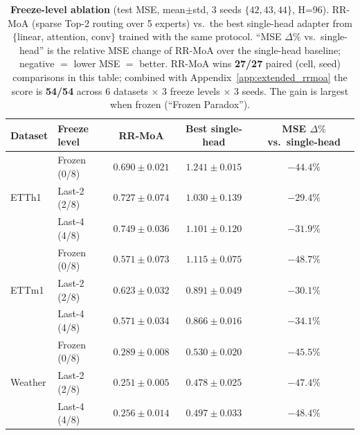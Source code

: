 \documentclass{article}
\begin{document}
\begin{table}[!htbp]
\centering
\caption{\textbf{Freeze-level ablation} (test MSE, mean$\pm$std, 3 seeds $\{42,43,44\}$, H=96). RR-MoA (sparse Top-2 routing over 5 experts) vs.\ the best single-head adapter from $\{$linear, attention, conv$\}$ trained with the same protocol. ``MSE $\Delta\%$ vs.\ single-head'' is the relative MSE change of RR-MoA over the single-head baseline; negative $=$ lower MSE $=$ better. RR-MoA wins \textbf{27/27} paired (cell, seed) comparisons in this table; combined with Appendix~\ref{app:extended_rrmoa} the score is \textbf{54/54} across 6 datasets $\times$ 3 freeze levels $\times$ 3 seeds. The gain is largest when frozen (``Frozen Paradox'').}
\label{tab:rrmoa}
\small
\begin{tabular}{@{}llccc@{}}
\toprule
Dataset & Freeze level & RR-MoA & Best single-head & MSE $\Delta\%$ vs.\ single-head \\
\midrule
\multirow{3}{*}{ETTh1}
 & Frozen (0/8)   & $\mathbf{0.690 \pm 0.021}$ & $1.241 \pm 0.015$ & $\mathbf{-44.4\%}$ \\
 & Last-2 (2/8)   & $\mathbf{0.727 \pm 0.074}$ & $1.030 \pm 0.139$ & $-29.4\%$ \\
 & Last-4 (4/8)   & $\mathbf{0.749 \pm 0.036}$ & $1.101 \pm 0.120$ & $-31.9\%$ \\
\midrule
\multirow{3}{*}{ETTm1}
 & Frozen (0/8)   & $\mathbf{0.571 \pm 0.073}$ & $1.115 \pm 0.075$ & $\mathbf{-48.7\%}$ \\
 & Last-2 (2/8)   & $\mathbf{0.623 \pm 0.032}$ & $0.891 \pm 0.049$ & $-30.1\%$ \\
 & Last-4 (4/8)   & $\mathbf{0.571 \pm 0.034}$ & $0.866 \pm 0.016$ & $-34.1\%$ \\
\midrule
\multirow{3}{*}{Weather}
 & Frozen (0/8)   & $\mathbf{0.289 \pm 0.008}$ & $0.530 \pm 0.020$ & $-45.5\%$ \\
 & Last-2 (2/8)   & $\mathbf{0.251 \pm 0.005}$ & $0.478 \pm 0.025$ & $-47.4\%$ \\
 & Last-4 (4/8)   & $\mathbf{0.256 \pm 0.014}$ & $0.497 \pm 0.033$ & $\mathbf{-48.4\%}$ \\
\bottomrule
\end{tabular}
\end{table}
\end{document}
